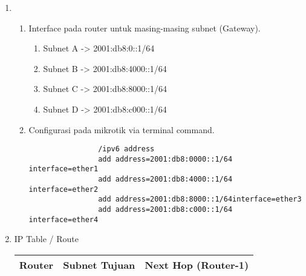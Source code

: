 \begin{enumerate}
	\item
        \begin{enumerate}[label =\alph*]
    	    \item Interface pada router untuk masing-masing subnet (Gateway).
                \begin{enumerate}
                    \item Subnet A -> 2001:db8:0::1/64
                    \item Subnet B -> 2001:db8:4000::1/64
                    \item Subnet C -> 2001:db8:8000::1/64
                    \item Subnet D -> 2001:db8:c000::1/64
                \end{enumerate}
            \item Configurasi pada mikrotik via terminal command.
                \begin{verbatim}
                /ipv6 address
                add address=2001:db8:0000::1/64 interface=ether1
                add address=2001:db8:4000::1/64 interface=ether2
                add address=2001:db8:8000::1/64interface=ether3
                add address=2001:db8:c000::1/64 interface=ether4
                \end{verbatim}
    	\end{enumerate}

    \item IP Table / Route
        \begin{longtable}{@{}lll@{}}
        \toprule
        \textbf{Router} & \textbf{Subnet Tujuan} & \textbf{Next Hop (Router-1)} \\ \midrule
        \endhead
        

\end{longtable}
\end{enumerate}
